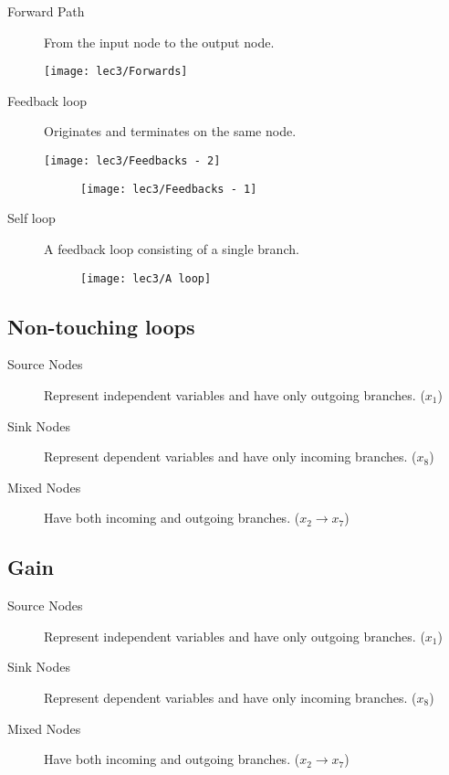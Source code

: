 \begin{description}
	\item[Forward Path]  From the input node to the output node.
		\begin{marginfigure}[-0.4233401538135892cm]
			\texttt{[image: lec3/Forwards]}
		\end{marginfigure}
	\vspace{2.7 cm}
	
	\item[Feedback loop]  Originates and terminates on the same node.
		\begin{marginfigure}[+0.4233401538135892cm]
			\texttt{[image: lec3/Feedbacks - 2]} 
		\end{marginfigure}
		\begin{figure}[h]
			\raggedleft
			\texttt{[image: lec3/Feedbacks - 1]}
		\end{figure}
	
	\item[Self loop]  A feedback loop consisting of a single branch.
		\begin{figure}[h]
			\raggedleft
			\texttt{[image: lec3/A loop]}
		\end{figure}
		
\end{description}

\subsection{Non-touching loops}

\begin{description}
	\item[Source Nodes]  Represent independent variables and have only outgoing branches. ($x_1$)
	\item[Sink Nodes]  Represent dependent variables and have only incoming branches. ($x_8$)
	\item[Mixed Nodes]  Have both incoming and outgoing branches. ($x_2 \to x_7$)
\end{description}

\subsection{Gain}
	
\begin{description}
	\item[Source Nodes]  Represent independent variables and have only outgoing branches. ($x_1$)
	\item[Sink Nodes]  Represent dependent variables and have only incoming branches. ($x_8$)
	\item[Mixed Nodes]  Have both incoming and outgoing branches. ($x_2 \to x_7$)
\end{description}


